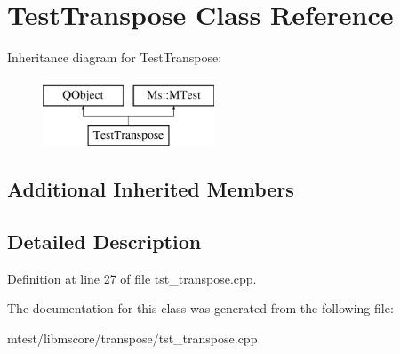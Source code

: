 \hypertarget{class_test_transpose}{}\section{Test\+Transpose Class Reference}
\label{class_test_transpose}
Inheritance diagram for Test\+Transpose\+:\begin{figure}[H]
\begin{center}
\leavevmode
\includegraphics[height=2.000000cm]{class_test_transpose}
\end{center}
\end{figure}
\subsection*{Additional Inherited Members}


\subsection{Detailed Description}


Definition at line 27 of file tst\+\_\+transpose.\+cpp.



The documentation for this class was generated from the following file\+:\begin{DoxyCompactItemize}
\item 
mtest/libmscore/transpose/tst\+\_\+transpose.\+cpp\end{DoxyCompactItemize}
